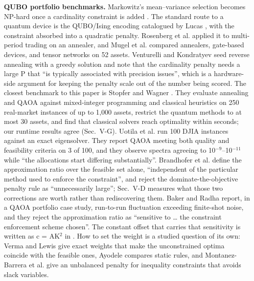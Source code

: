 \documentclass{ieeeaccess}
\begin{document}
\textbf{QUBO portfolio benchmarks.} Markowitz's mean--variance selection \cite{ref1} becomes NP-hard once a cardinality constraint is added \cite{ref2}. The standard route to a quantum device is the QUBO/Ising encoding catalogued by Lucas \cite{ref3}, with the constraint absorbed into a quadratic penalty. Rosenberg et al. \cite{ref15} applied it to multi-period trading on an annealer, and Mugel et al. \cite{ref16} compared annealers, gate-based devices, and tensor networks on 52 assets. Venturelli and Kondratyev \cite{ref17} seed reverse annealing with a greedy solution and note that the cardinality penalty needs a large P that ``is typically associated with precision issues'', which is a hardware-side argument for keeping the penalty scale out of the number being scored. The closest benchmark to this paper is Stopfer and Wagner \cite{ref13}. They evaluate annealing and QAOA against mixed-integer programming and classical heuristics on 250 real-market instances of up to 1,000 assets, restrict the quantum methods to at most 30 assets, and find that classical solvers reach optimality within seconds; our runtime results agree (Sec.~V-G). Uotila et al. \cite{ref18} run 100 DJIA instances against an exact eigensolver. They report QAOA meeting both quality and feasibility criteria on 3 of 100, and they observe spectra agreeing to 10$^{-9}$--10$^{-11}$ while ``the allocations start differing substantially''. Brandhofer et al. \cite{ref8} define the approximation ratio over the feasible set alone, ``independent of the particular method used to enforce the constraint'', and reject the dominate-the-objective penalty rule as ``unnecessarily large''; Sec.~V-D measures what those two corrections are worth rather than rediscovering them. Baker and Radha \cite{ref9} report, in a QAOA portfolio case study, run-to-run fluctuation exceeding finite-shot noise, and they reject the approximation ratio as ``sensitive to \ldots{} the constraint enforcement scheme chosen''. The constant offset that carries that sensitivity is written as c = AK$^{2}$ in \cite{ref10}. How to set the weight is a studied question of its own: Verma and Lewis \cite{ref19} give exact weights that make the unconstrained optima coincide with the feasible ones, Ayodele \cite{ref20} compares static rules, and Montanez-Barrera et al. \cite{ref21} give an unbalanced penalty for inequality constraints that avoids slack variables.
\end{document}
